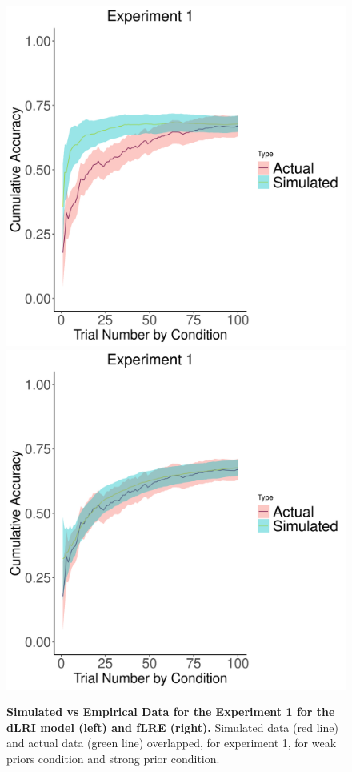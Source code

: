 \documentclass[a4paper,12pt]{article}
\begin{document}
\begin{figure}[ht!]
{\includegraphics{figures/SimulatedVsActual.exp=exp1.mod=dLR_Instr.png}}\vfill
{\includegraphics{figures/SimulatedVsActual.exp=exp1.mod=fLR_Eval.png}}
\caption{\textbf{Simulated vs Empirical Data for the Experiment 1 for the dLRI model (left) and fLRE (right).} Simulated data (red line) and actual data (green line) overlapped, for experiment 1, for weak priors condition and strong prior condition. }
\label{fig:simvsemp_dlr_flrI_exp1}
\end{figure}
\end{document}
